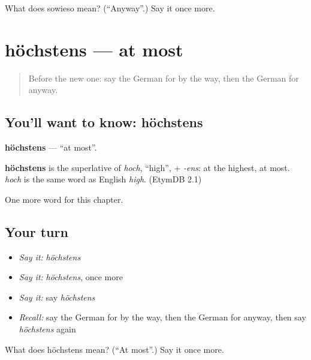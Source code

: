 \begin{tcolorbox}[breakable,colback=teal!4,colframe=teal!35!black,title={Before you move on}]
What does sowieso mean? (\textquotedblleft{}Anyway\textquotedblright{}.) Say it once more.
\end{tcolorbox}
\section[höchstens]{höchstens — at most}

\label{lesson:GE-C251-hoechstens}



\begin{quote}
Before the new one: say the German for by the way, then the German for anyway.
\end{quote}

\subsection*{You'll want to know: höchstens}
\textbf{höchstens} — \textquotedblleft{}at most\textquotedblright{}.

\begin{cousinweb}
\textbf{höchstens} is the superlative of \emph{hoch}, \textquotedblleft{}high\textquotedblright{}, + \emph{-ens}: at the highest, at most. \emph{hoch} is the same word as English \emph{high}. (EtymDB 2.1)
\end{cousinweb}

\begin{grammarlens}[title={What you've built}]
One more word for this chapter.
\end{grammarlens}

\subsection*{Your turn}
\begin{itemize}
\raggedright
  \item \emph{Say it:} \emph{höchstens}
  \item \emph{Say it:} \emph{höchstens}, once more
  \item \emph{Say it:} say \emph{höchstens}
  \item \emph{Recall:} say the German for by the way, then the German for anyway, then say \emph{höchstens} again
\end{itemize}

\begin{tcolorbox}[breakable,colback=teal!4,colframe=teal!35!black,title={Before you move on}]
What does höchstens mean? (\textquotedblleft{}At most\textquotedblright{}.) Say it once more.
\end{tcolorbox}

